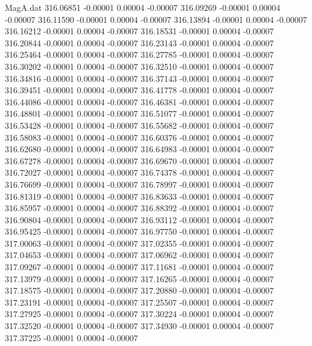 \begin{filecontents}{MagA.dat}
 316.06851   -0.00001    0.00004   -0.00007
 316.09269   -0.00001    0.00004   -0.00007
 316.11590   -0.00001    0.00004   -0.00007
 316.13894   -0.00001    0.00004   -0.00007
 316.16212   -0.00001    0.00004   -0.00007
 316.18531   -0.00001    0.00004   -0.00007
 316.20844   -0.00001    0.00004   -0.00007
 316.23143   -0.00001    0.00004   -0.00007
 316.25464   -0.00001    0.00004   -0.00007
 316.27785   -0.00001    0.00004   -0.00007
 316.30202   -0.00001    0.00004   -0.00007
 316.32510   -0.00001    0.00004   -0.00007
 316.34816   -0.00001    0.00004   -0.00007
 316.37143   -0.00001    0.00004   -0.00007
 316.39451   -0.00001    0.00004   -0.00007
 316.41778   -0.00001    0.00004   -0.00007
 316.44086   -0.00001    0.00004   -0.00007
 316.46381   -0.00001    0.00004   -0.00007
 316.48801   -0.00001    0.00004   -0.00007
 316.51077   -0.00001    0.00004   -0.00007
 316.53428   -0.00001    0.00004   -0.00007
 316.55682   -0.00001    0.00004   -0.00007
 316.58083   -0.00001    0.00004   -0.00007
 316.60376   -0.00001    0.00004   -0.00007
 316.62680   -0.00001    0.00004   -0.00007
 316.64983   -0.00001    0.00004   -0.00007
 316.67278   -0.00001    0.00004   -0.00007
 316.69670   -0.00001    0.00004   -0.00007
 316.72027   -0.00001    0.00004   -0.00007
 316.74378   -0.00001    0.00004   -0.00007
 316.76699   -0.00001    0.00004   -0.00007
 316.78997   -0.00001    0.00004   -0.00007
 316.81319   -0.00001    0.00004   -0.00007
 316.83633   -0.00001    0.00004   -0.00007
 316.85957   -0.00001    0.00004   -0.00007
 316.88392   -0.00001    0.00004   -0.00007
 316.90804   -0.00001    0.00004   -0.00007
 316.93112   -0.00001    0.00004   -0.00007
 316.95425   -0.00001    0.00004   -0.00007
 316.97750   -0.00001    0.00004   -0.00007
 317.00063   -0.00001    0.00004   -0.00007
 317.02355   -0.00001    0.00004   -0.00007
 317.04653   -0.00001    0.00004   -0.00007
 317.06962   -0.00001    0.00004   -0.00007
 317.09267   -0.00001    0.00004   -0.00007
 317.11681   -0.00001    0.00004   -0.00007
 317.13979   -0.00001    0.00004   -0.00007
 317.16265   -0.00001    0.00004   -0.00007
 317.18575   -0.00001    0.00004   -0.00007
 317.20880   -0.00001    0.00004   -0.00007
 317.23191   -0.00001    0.00004   -0.00007
 317.25507   -0.00001    0.00004   -0.00007
 317.27925   -0.00001    0.00004   -0.00007
 317.30224   -0.00001    0.00004   -0.00007
 317.32520   -0.00001    0.00004   -0.00007
 317.34930   -0.00001    0.00004   -0.00007
 317.37225   -0.00001    0.00004   -0.00007
\end{filecontents}

